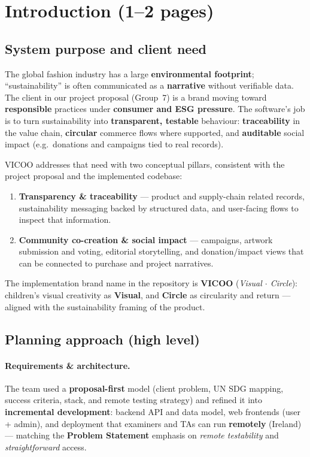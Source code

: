 \documentclass[11pt,a4paper]{article}
\begin{document}
\newpage

\section{Introduction (1--2 pages)}

\subsection{System purpose and client need}
The global fashion industry has a large \textbf{environmental footprint}; ``sustainability'' is often communicated as a \textbf{narrative} without verifiable data. The client in our project proposal (Group~7) is a brand moving toward \textbf{responsible} practices under \textbf{consumer and ESG pressure}. The software's job is to turn sustainability into \textbf{transparent, testable} behaviour: \textbf{traceability} in the value chain, \textbf{circular} commerce flows where supported, and \textbf{auditable} social impact (e.g.\ donations and campaigns tied to real records).

VICOO addresses that need with two conceptual pillars, consistent with the project proposal and the implemented codebase:
\begin{enumerate}[label=\textbf{\arabic*}, leftmargin=1.4em]
  \item \textbf{Transparency \& traceability} --- product and supply-chain related records, sustainability messaging backed by structured data, and user-facing flows to inspect that information.
  \item \textbf{Community co-creation \& social impact} --- campaigns, artwork submission and voting, editorial storytelling, and donation/impact views that can be connected to purchase and project narratives.
\end{enumerate}

The implementation brand name in the repository is \textbf{VICOO} (\emph{Visual $\cdot$ Circle}): children's visual creativity as \textbf{Visual}, and \textbf{Circle} as circularity and return --- aligned with the sustainability framing of the product.

\subsection{Planning approach (high level)}

\paragraph{Requirements \& architecture.}
The team used a \textbf{proposal-first} model (client problem, UN SDG mapping, success criteria, stack, and remote testing strategy) and refined it into \textbf{incremental development}: backend API and data model, web frontends (user + admin), and deployment that examiners and TAs can run \textbf{remotely} (Ireland) --- matching the \textbf{Problem Statement} emphasis on \emph{remote testability} and \emph{straightforward} access.
\end{document}
